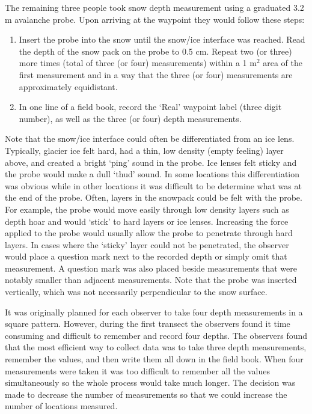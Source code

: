 \documentclass{sfuthesis}
\begin{document}
The remaining three people took snow depth measurement using a graduated 3.2 m avalanche probe. Upon arriving at the waypoint they would follow these steps:
\begin{enumerate}
\item Insert the probe into the snow until the snow/ice interface was reached. Read the depth of the snow pack on the probe to 0.5 cm. Repeat two (or three) more times (total of three (or four) measurements) within a 1 m$^2$ area of the first measurement and in a way that the three (or four) measurements are approximately equidistant. 
\item In one line of a field book, record the `Real' waypoint label (three digit number), as well as the three (or four) depth measurements. 
\end{enumerate}
Note that the snow/ice interface could often be differentiated from an ice lens. Typically, glacier ice felt hard, had a thin, low density (empty feeling) layer above, and created a bright `ping' sound in the probe. Ice lenses felt sticky and the probe would make a dull `thud' sound. In some locations this differentiation was obvious while in other locations it was difficult to be determine what was at the end of the probe. Often, layers in the snowpack could be felt with the probe. For example, the probe would move easily through low density layers such as depth hoar and would `stick' to hard layers or ice lenses. Increasing the force applied to the probe would usually allow the probe to penetrate through hard layers. In cases where the `sticky' layer could not be penetrated, the observer would place a question mark next to the recorded depth or simply omit that measurement. A question mark was also placed beside measurements that were notably smaller than adjacent measurements. Note that the probe was inserted vertically, which was not necessarily perpendicular to the snow surface.

It was originally planned for each observer to take four depth measurements in a square pattern. However, during the first transect the observers found it time consuming and difficult to remember and record four depths. The observers found that the most efficient way to collect data was to take three depth measurements, remember the values, and then write them all down in the field book. When four measurements were taken it was too difficult to remember all the values simultaneously so the whole process would take much longer. The decision was made to decrease the number of measurements so that we could increase the number of locations measured. 
\end{document}
